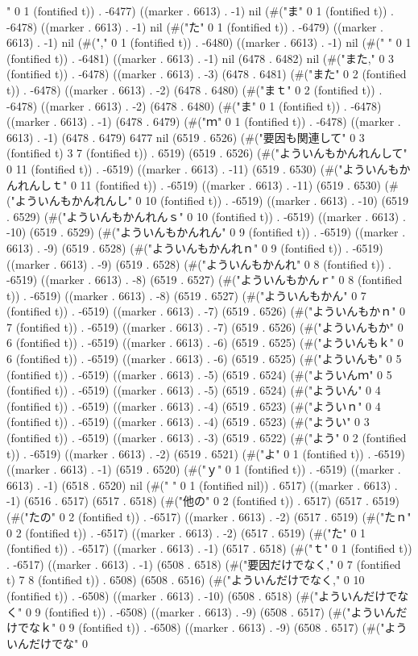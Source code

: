 " 0 1 (fontified t)) . -6477) ((marker . 6613) . -1) nil (#("ま" 0 1 (fontified t)) . -6478) ((marker . 6613) . -1) nil (#("た" 0 1 (fontified t)) . -6479) ((marker . 6613) . -1) nil (#("," 0 1 (fontified t)) . -6480) ((marker . 6613) . -1) nil (#(" " 0 1 (fontified t)) . -6481) ((marker . 6613) . -1) nil (6478 . 6482) nil (#("また," 0 3 (fontified t)) . -6478) ((marker . 6613) . -3) (6478 . 6481) (#("また" 0 2 (fontified t)) . -6478) ((marker . 6613) . -2) (6478 . 6480) (#("まｔ" 0 2 (fontified t)) . -6478) ((marker . 6613) . -2) (6478 . 6480) (#("ま" 0 1 (fontified t)) . -6478) ((marker . 6613) . -1) (6478 . 6479) (#("ｍ" 0 1 (fontified t)) . -6478) ((marker . 6613) . -1) (6478 . 6479) 6477 nil (6519 . 6526) (#("要因も関連して" 0 3 (fontified t) 3 7 (fontified t)) . 6519) (6519 . 6526) (#("よういんもかんれんして" 0 11 (fontified t)) . -6519) ((marker . 6613) . -11) (6519 . 6530) (#("よういんもかんれんしｔ" 0 11 (fontified t)) . -6519) ((marker . 6613) . -11) (6519 . 6530) (#("よういんもかんれんし" 0 10 (fontified t)) . -6519) ((marker . 6613) . -10) (6519 . 6529) (#("よういんもかんれんｓ" 0 10 (fontified t)) . -6519) ((marker . 6613) . -10) (6519 . 6529) (#("よういんもかんれん" 0 9 (fontified t)) . -6519) ((marker . 6613) . -9) (6519 . 6528) (#("よういんもかんれｎ" 0 9 (fontified t)) . -6519) ((marker . 6613) . -9) (6519 . 6528) (#("よういんもかんれ" 0 8 (fontified t)) . -6519) ((marker . 6613) . -8) (6519 . 6527) (#("よういんもかんｒ" 0 8 (fontified t)) . -6519) ((marker . 6613) . -8) (6519 . 6527) (#("よういんもかん" 0 7 (fontified t)) . -6519) ((marker . 6613) . -7) (6519 . 6526) (#("よういんもかｎ" 0 7 (fontified t)) . -6519) ((marker . 6613) . -7) (6519 . 6526) (#("よういんもか" 0 6 (fontified t)) . -6519) ((marker . 6613) . -6) (6519 . 6525) (#("よういんもｋ" 0 6 (fontified t)) . -6519) ((marker . 6613) . -6) (6519 . 6525) (#("よういんも" 0 5 (fontified t)) . -6519) ((marker . 6613) . -5) (6519 . 6524) (#("よういんｍ" 0 5 (fontified t)) . -6519) ((marker . 6613) . -5) (6519 . 6524) (#("よういん" 0 4 (fontified t)) . -6519) ((marker . 6613) . -4) (6519 . 6523) (#("よういｎ" 0 4 (fontified t)) . -6519) ((marker . 6613) . -4) (6519 . 6523) (#("ようい" 0 3 (fontified t)) . -6519) ((marker . 6613) . -3) (6519 . 6522) (#("よう" 0 2 (fontified t)) . -6519) ((marker . 6613) . -2) (6519 . 6521) (#("よ" 0 1 (fontified t)) . -6519) ((marker . 6613) . -1) (6519 . 6520) (#("ｙ" 0 1 (fontified t)) . -6519) ((marker . 6613) . -1) (6518 . 6520) nil (#(" " 0 1 (fontified nil)) . 6517) ((marker . 6613) . -1) (6516 . 6517) (6517 . 6518) (#("他の" 0 2 (fontified t)) . 6517) (6517 . 6519) (#("たの" 0 2 (fontified t)) . -6517) ((marker . 6613) . -2) (6517 . 6519) (#("たｎ" 0 2 (fontified t)) . -6517) ((marker . 6613) . -2) (6517 . 6519) (#("た" 0 1 (fontified t)) . -6517) ((marker . 6613) . -1) (6517 . 6518) (#("ｔ" 0 1 (fontified t)) . -6517) ((marker . 6613) . -1) (6508 . 6518) (#("要因だけでなく," 0 7 (fontified t) 7 8 (fontified t)) . 6508) (6508 . 6516) (#("よういんだけでなく," 0 10 (fontified t)) . -6508) ((marker . 6613) . -10) (6508 . 6518) (#("よういんだけでなく" 0 9 (fontified t)) . -6508) ((marker . 6613) . -9) (6508 . 6517) (#("よういんだけでなｋ" 0 9 (fontified t)) . -6508) ((marker . 6613) . -9) (6508 . 6517) (#("よういんだけでな" 0 